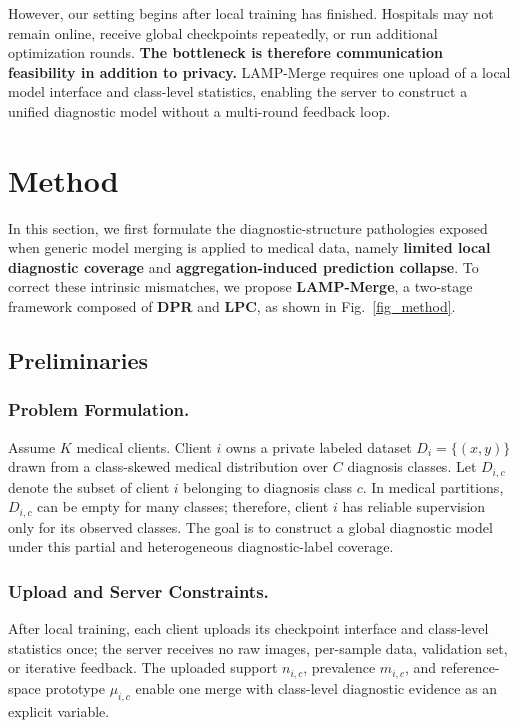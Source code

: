 \documentclass[letterpaper]{article} %
\begin{document}
However, our setting begins after local training has finished. Hospitals may not remain online, receive global checkpoints repeatedly, or run additional optimization rounds. \textbf{The bottleneck is therefore communication feasibility in addition to privacy.} LAMP-Merge requires one upload of a local model interface and class-level statistics, enabling the server to construct a unified diagnostic model without a multi-round feedback loop.

\section{Method}

In this section, we first formulate the diagnostic-structure pathologies exposed when generic model merging is applied to medical data, namely \textbf{limited local diagnostic coverage} and \textbf{aggregation-induced prediction collapse}. To correct these intrinsic mismatches, we propose \textbf{LAMP-Merge}, a two-stage framework composed of \textbf{DPR} and \textbf{LPC}, as shown in Fig.~\ref{fig_method}.

\subsection{Preliminaries}

\subsubsection{Problem Formulation.}

Assume $K$ medical clients. Client $i$ owns a private labeled dataset $D_i=\{(x,y)\}$ drawn from a class-skewed medical distribution over $C$ diagnosis classes. Let $D_{i,c}$ denote the subset of client $i$ belonging to diagnosis class $c$. In medical partitions, $D_{i,c}$ can be empty for many classes; therefore, client $i$ has reliable supervision only for its observed classes. The goal is to construct a global diagnostic model under this partial and heterogeneous diagnostic-label coverage.

\subsubsection{Upload and Server Constraints.}

After local training, each client uploads its checkpoint interface and class-level statistics once; the server receives no raw images, per-sample data, validation set, or iterative feedback. The uploaded support $n_{i,c}$, prevalence $m_{i,c}$, and reference-space prototype $\mu_{i,c}$ enable one merge with class-level diagnostic evidence as an explicit variable.
\end{document}
